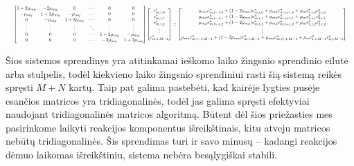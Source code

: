 \begin{align*}
  \resizebox{\textwidth}{!}{$
  \begin{bmatrix}
    1 + 2\mu_{my} & -2\mu_{my} & 0 & \cdots & 0 & 0\\
    -\mu_{my} & 1 + 2\mu_{my} & -\mu_{my} & \cdots & 0 & 0\\
    0 & -\mu_{my} & 1 + 2\mu_{my} & \cdots & 0 & 0\\
    \vdots & \vdots & \vdots & \ddots & \vdots & \vdots\\
    0 & 0 & 0 & \cdots & 1 + 2\mu_{my} & -\mu_{my}\\
    0 & 0 & 0 & \cdots & -2\mu_{my} & 1 + 2\mu_{my}
  \end{bmatrix}
  \begin{bmatrix}
    c^*_{m,i,0}\\
    c^*_{m,i,1}\\
    c^*_{m,i,2}\\
    \vdots\\
    c^*_{m,i,M-1}
  \end{bmatrix}
  =
  \begin{bmatrix}
    \mu_{mx}c^n_{m,i-1,0}+(1-2\mu_{mx})c^n_{m,i,0}+\mu_{mx}c^n_{m,i+1,0}+\mu_m c^n_{1,i,0}c^n_{2,i,0}\\
    \mu_{mx}c^n_{m,i-1,1}+(1-2\mu_{mx})c^n_{m,i,1}+\mu_{mx}c^n_{m,i+1,1}+\mu_m c^n_{1,i,1}c^n_{2,i,1}\\
    \mu_{mx}c^n_{m,i-1,2}+(1-2\mu_{mx})c^n_{m,i,2}+\mu_{mx}c^n_{m,i+1,2}+\mu_m c^n_{1,i,2}c^n_{2,i,2}\\
    \vdots\\
    \mu_{mx}c^n_{m,i-1,M-1}+(1-2\mu_{mx})c^n_{m,i,M-1}+\mu_{mx}c^n_{m,i+1,M-1}+\mu_m c^n_{1,i,M-1}c^n_{2,i,M-1}
  \end{bmatrix}
  $}
\end{align*}

Šios sistemos sprendinys yra atitinkamai ieškomo laiko žingsnio sprendinio eilutė arba stulpelis, todėl kiekvieno laiko žingsnio sprendiniui rasti šią sistemą reikės spręsti $M + N$ kartų. Taip pat galima pastebėti, kad kairėje lygties pusėje esančios matricos yra tridiagonalinės, todėl jas galima spręsti efektyviai naudojant tridiagonalinės matricos algoritmą. Būtent dėl šios priežasties mes pasirinkome laikyti reakcijos komponentus išreikštinais, kitu atveju matricos nebūtų tridiagonalinės. Šis sprendimas turi ir savo minusų -- kadangi reakcijos dėmuo laikomas išreikštiniu, sistema nebėra besąlygiškai stabili.